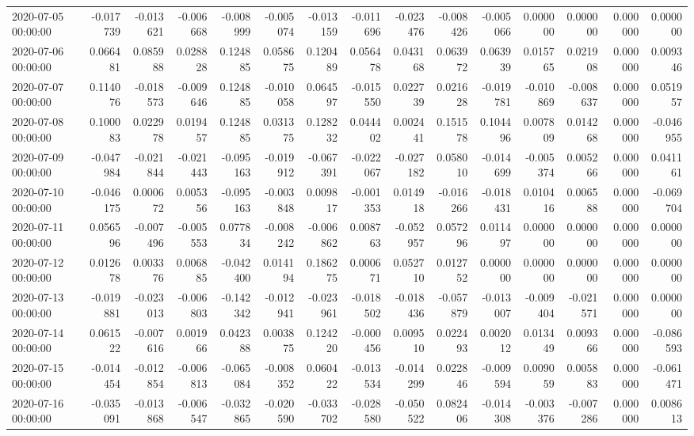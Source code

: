 \begin{tabular}{lrrrrrrrrrrrrrr}
2020-07-05 00:00:00 & -0.017739 & -0.013621 & -0.006668 & -0.008999 & -0.005074 & -0.013159 & -0.011696 & -0.023476 & -0.008426 & -0.005066 & 0.000000 & 0.000000 & 0.000000 & 0.000000 \\
2020-07-06 00:00:00 & 0.066481 & 0.085988 & 0.028828 & 0.124885 & 0.058675 & 0.120489 & 0.056478 & 0.043168 & 0.063972 & 0.063939 & 0.015765 & 0.021908 & 0.000000 & 0.009346 \\
2020-07-07 00:00:00 & 0.114076 & -0.018573 & -0.009646 & 0.124885 & -0.010058 & 0.064597 & -0.015550 & 0.022739 & 0.021628 & -0.019781 & -0.010869 & -0.008637 & 0.000000 & 0.051957 \\
2020-07-08 00:00:00 & 0.100083 & 0.022978 & 0.019457 & 0.124885 & 0.031375 & 0.128232 & 0.044402 & 0.002441 & 0.151578 & 0.104496 & 0.007809 & 0.014268 & 0.000000 & -0.046955 \\
2020-07-09 00:00:00 & -0.047984 & -0.021844 & -0.021443 & -0.095163 & -0.019912 & -0.067391 & -0.022067 & -0.027182 & 0.058010 & -0.014699 & -0.005374 & 0.005266 & 0.000000 & 0.041161 \\
2020-07-10 00:00:00 & -0.046175 & 0.000672 & 0.005356 & -0.095163 & -0.003848 & 0.009817 & -0.001353 & 0.014918 & -0.016266 & -0.018431 & 0.010416 & 0.006588 & 0.000000 & -0.069704 \\
2020-07-11 00:00:00 & 0.056596 & -0.007496 & -0.005553 & 0.077834 & -0.008242 & -0.006862 & 0.008763 & -0.052957 & 0.057296 & 0.011497 & 0.000000 & 0.000000 & 0.000000 & 0.000000 \\
2020-07-12 00:00:00 & 0.012678 & 0.003376 & 0.006885 & -0.042400 & 0.014194 & 0.186275 & 0.000671 & 0.052710 & 0.012752 & 0.000000 & 0.000000 & 0.000000 & 0.000000 & 0.000000 \\
2020-07-13 00:00:00 & -0.019881 & -0.023013 & -0.006803 & -0.142342 & -0.012941 & -0.023961 & -0.018502 & -0.018436 & -0.057879 & -0.013007 & -0.009404 & -0.021571 & 0.000000 & 0.000000 \\
2020-07-14 00:00:00 & 0.061522 & -0.007616 & 0.001966 & 0.042388 & 0.003875 & 0.124220 & -0.000456 & 0.009510 & 0.022493 & 0.002012 & 0.013449 & 0.009366 & 0.000000 & -0.086593 \\
2020-07-15 00:00:00 & -0.014454 & -0.012854 & -0.006813 & -0.065084 & -0.008352 & 0.060422 & -0.013534 & -0.014299 & 0.022846 & -0.009594 & 0.009059 & 0.005883 & 0.000000 & -0.061471 \\
2020-07-16 00:00:00 & -0.035091 & -0.013868 & -0.006547 & -0.032865 & -0.020590 & -0.033702 & -0.028580 & -0.050522 & 0.082406 & -0.014308 & -0.003376 & -0.007286 & 0.000000 & 0.008613 \\

\end{tabular}
